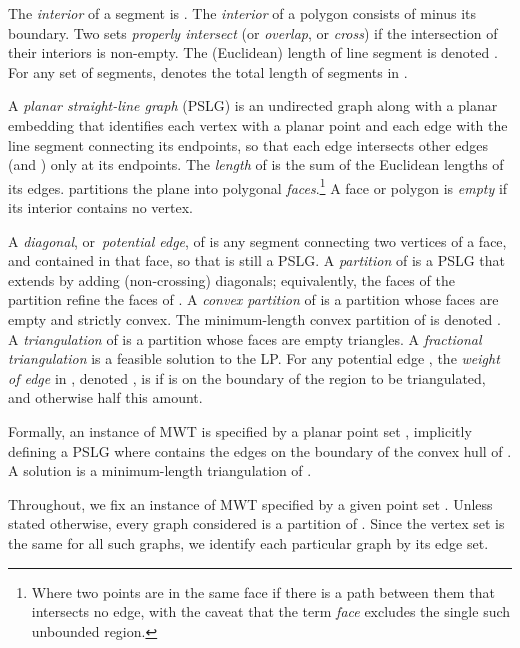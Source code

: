 \documentclass[final]{siamltex}
\begin{document}
\smallskip
\begin{definition}
The {\em interior} of a segment  is .
The {\em interior} of a polygon  consists of  minus its boundary.
Two sets {\em properly intersect} (or {\em overlap}, or {\em cross}) 
if the intersection of their interiors is non-empty.
The (Euclidean) length of line segment  is denoted .
For any set  of segments, 
 denotes the total length of segments in . 

A {\em planar straight-line graph} (PSLG) is an undirected graph 
along with a planar embedding that identifies each vertex with a planar point
and each edge with the line segment connecting its endpoints,
so that each edge intersects other edges (and ) only at its endpoints.
The {\em length} of  is the sum of the Euclidean lengths of its edges.
 partitions the plane into polygonal {\em faces}.\footnote
{Where two points are in the same face if there is a path between them that intersects no edge,
with the caveat that the term {\em face} excludes the single such unbounded region.}
A face or polygon is {\em empty} if its interior contains no vertex.

A {\em diagonal}, or~{\em potential edge}, of  
is any segment  connecting two vertices of a face,
and contained in that face, so that  is still a PSLG.
A {\em partition} of  is a PSLG that extends  by adding (non-crossing) diagonals;
equivalently, the faces of the partition refine the faces of .
A {\em convex partition} of  is a partition whose faces are empty and strictly convex.
The minimum-length convex partition of  is denoted .
A {\em triangulation} of  is a partition whose faces are empty triangles.
A {\em fractional triangulation}  is a feasible solution to the LP.
For any potential edge , the {\em weight of edge}  in , denoted , 
is  if  is on
the boundary of the region to be triangulated, and otherwise half this amount.



Formally, an instance of MWT is specified by a planar point set ,
implicitly defining a PSLG  where  contains the edges 
on the boundary of the convex hull of .
A solution is a minimum-length triangulation of .
\end{definition}


Throughout, we fix an instance  of MWT specified by a given point set .
Unless stated otherwise, every graph considered is a partition of .
Since the vertex set  is the same for all such graphs, we identify each particular graph by its edge set.
\end{document}
